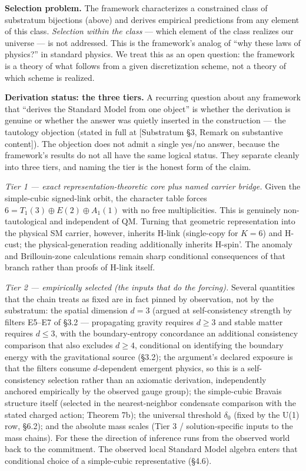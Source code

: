 \documentclass[
]{article}
\begin{document}
\textbf{Selection problem.} The framework characterizes a constrained
class of substratum bijections (above) and derives empirical predictions
from any element of this class. \emph{Selection within the class} ---
which element of the class realizes our universe --- is not addressed.
This is the framework's analog of ``why these laws of physics?'' in
standard physics. We treat this as an open question: the framework is a
theory of what follows from a given discretization scheme, not a theory
of which scheme is realized.

\textbf{Derivation status: the three tiers.} A recurring question about
any framework that ``derives the Standard Model from one object'' is
whether the derivation is genuine or whether the answer was quietly
inserted in the construction --- the tautology objection (stated in full
at {[}Substratum §3, Remark on substantive content{]}). The objection
does not admit a single yes/no answer, because the framework's results
do not all have the same logical status. They separate cleanly into
three tiers, and naming the tier is the honest form of the claim.

\emph{Tier 1 --- exact representation-theoretic core plus named carrier
bridge.} Given the simple-cubic signed-link orbit, the character table
forces \(6=T_1(3)\oplus E(2)\oplus A_1(1)\) with no free multiplicities.
This is genuinely non-tautological and independent of QM. Turning that
geometric representation into the physical SM carrier, however, inherits
H-link (single-copy for \(K=6\)) and H-cust; the physical-generation
reading additionally inherits H-spin'. The anomaly and Brillouin-zone
calculations remain sharp conditional consequences of that branch rather
than proofs of H-link itself.

\emph{Tier 2 --- empirically selected (the inputs that do the forcing).}
Several quantities that the chain treats as fixed are in fact pinned by
observation, not by the substratum: the spatial dimension \(d=3\)
(argued at self-consistency strength by filters E5--E7 of §3.2 ---
propagating gravity requires \(d \geq 3\) and stable matter requires
\(d \leq 3\), with the boundary-entropy concordance an additional
consistency comparison that also excludes \(d \geq 4\), conditional on
identifying the boundary energy with the gravitational source (§3.2);
the argument's declared exposure is that the filters consume
\(d\)-dependent emergent physics, so this is a self-consistency
selection rather than an axiomatic derivation, independently anchored
empirically by the observed gauge group); the simple-cubic Bravais
structure itself (selected in the nearest-neighbor condensate comparison
with the stated charged action; Theorem 7b); the universal threshold
\(\delta_0\) (fixed by the U(1) row, §6.2); and the absolute mass scales
(Tier 3 / solution-specific inputs to the mass chains). For these the
direction of inference runs from the observed world back to the
commitment. The observed local Standard Model algebra enters that
conditional choice of a simple-cubic representative (§4.6).
\end{document}
